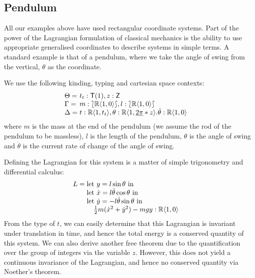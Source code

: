 \documentclass[preprint]{sigplanconf}
\newcommand{\typeOfCartSp}[1]{\lbag #1 \rbag}
\theoremstyle{examplestyle}
\begin{document}
\subsection{Pendulum}

All our examples above have used rectangular coordinate systems. Part
of the power of the Lagrangian formulation of classical mechanics is
the ability to use appropriate generalised coordinates to describe
systems in simple terms. A standard example is that of a pendulum,
where we take the angle of swing from the vertical, $\theta$ as the
coordinate.

We use the following kinding, typing and cartesian space contexts:
\begin{displaymath}
  \begin{array}{l@{\hspace{0.3em}}l}
    \Theta = & t_t : \mathsf{T}(1), z : \mathsf{Z} \\
    \Gamma = & m : \typeOfCartSp{\mathbb{R}\langle 1, 0 \rangle}, l : \typeOfCartSp{\mathbb{R}\langle 1, 0 \rangle} \\
    \Delta = &
    \begin{array}[t]{@{}l}
      t : \mathbb{R}\langle 1, t_t \rangle, \theta : \mathbb{R}\langle 1, \underline{2\pi}*z \rangle. \dot{\theta} : \mathbb{R}\langle 1, 0 \rangle
\end{array}
  \end{array}
\end{displaymath}
where $m$ is the mass at the end of the pendulum (we assume the rod of
the pendulum to be massless), $l$ is the length of the pendulum,
$\theta$ is the angle of swing and $\dot{\theta}$ is the current rate
of change of the angle of swing.

Defining the Lagrangian for this system is a matter of simple
trigonometry and differential calculus:
\begin{displaymath}
  L =
  \begin{array}[t]{@{}l}
    \textrm{let }y = l\sin \theta \textrm{ in} \\
    \textrm{let }\dot{x} = l\dot{\theta}\cos \theta \textrm{ in} \\
    \textrm{let }\dot{y} = - l\dot{\theta}\sin \theta \textrm{ in} \\
    \quad \frac{1}{2}m(\dot{x}^2 + \dot{y}^2) - mgy : \mathbb{R}\langle 1, 0 \rangle
  \end{array}
\end{displaymath}
From the type of $t$, we can easily determine that this Lagrangian is
invariant under translation in time, and hence the total energy is a
conserved quantity of this system. We can also derive another free
theorem due to the quantification over the group of integers via the
variable $z$. However, this does not yield a continuous invariance of
the Lagrangian, and hence no conserved quantity via Noether's theorem.
\end{document}
